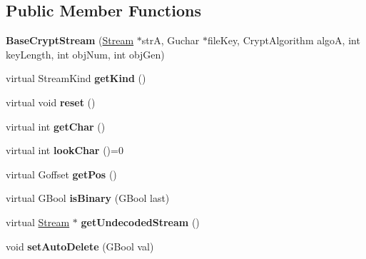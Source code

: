 \subsection*{Public Member Functions}
\begin{DoxyCompactItemize}
\item 
\mbox{\label{class_base_crypt_stream_a3289803906c8fec9e905a492673b2935}} 
{\bfseries Base\+Crypt\+Stream} (\hyperlink{class_stream}{Stream} $\ast$strA, Guchar $\ast$file\+Key, Crypt\+Algorithm algoA, int key\+Length, int obj\+Num, int obj\+Gen)
\item 
\mbox{\label{class_base_crypt_stream_a9b82c037273a5c60dcea4d86d2741278}} 
virtual Stream\+Kind {\bfseries get\+Kind} ()
\item 
\mbox{\label{class_base_crypt_stream_a81853b9aa41dfafcda80d81f44cf01e6}} 
virtual void {\bfseries reset} ()
\item 
\mbox{\label{class_base_crypt_stream_ae3cf97cc552fb2825d64c014fb4f0fd9}} 
virtual int {\bfseries get\+Char} ()
\item 
\mbox{\label{class_base_crypt_stream_a0d5fe73923728fe4ac1c9c17435103d8}} 
virtual int {\bfseries look\+Char} ()=0
\item 
\mbox{\label{class_base_crypt_stream_a751bcd657af046d416fdcd1139181e76}} 
virtual Goffset {\bfseries get\+Pos} ()
\item 
\mbox{\label{class_base_crypt_stream_ab60e5f18cbf3ede338ce5edf28232205}} 
virtual G\+Bool {\bfseries is\+Binary} (G\+Bool last)
\item 
\mbox{\label{class_base_crypt_stream_a0d3bfce16d422e7ece00ca33e0c10ba4}} 
virtual \hyperlink{class_stream}{Stream} $\ast$ {\bfseries get\+Undecoded\+Stream} ()
\item 
\mbox{\label{class_base_crypt_stream_ac2d9554891ddc9cd5cd7db0a6b9ebc97}} 
void {\bfseries set\+Auto\+Delete} (G\+Bool val)
\end{DoxyCompactItemize}
